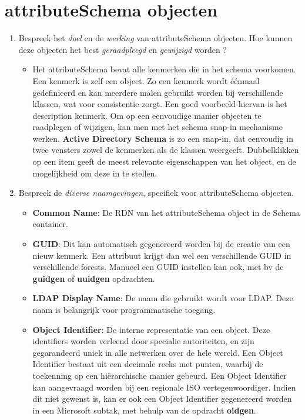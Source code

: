 \documentclass{report}
\newcommand{\vraag}[2]{
	\item #1
	
	#2
}
\begin{document}
	\section{attributeSchema objecten }
	\begin{enumerate}
		\vraag { Bespreek het \textit{doel} en de \textit{werking} van attributeSchema objecten. Hoe kunnen deze objecten het best \textit{geraadpleegd} en \textit{gewijzigd} worden ? } { 
		\begin{itemize}
			\item Het attributeSchema bevat alle kenmerken die in het schema voorkomen. Een kenmerk is zelf een object. Zo een kenmerk wordt éénmaal gedefinieerd en kan meerdere malen gebruikt worden bij verschillende klassen, wat voor consistentie zorgt. Een goed voorbeeld hiervan is het description kenmerk. Om op een eenvoudige manier objecten te raadplegen of wijzigen, kan men met het schema snap-in mechanisme werken. \textbf{Active Directory Schema} is zo een snap-in, dat eenvoudig in twee vensters zowel de kenmerken als de klassen weergeeft. Dubbelklikken op een item geeft de meest relevante eigenschappen van het object, en de mogelijkheid om deze in te stellen. 
		\end{itemize}
		}
		
		\vraag { Bespreek de \textit{diverse naamgevingen}, specifiek voor attributeSchema objecten. } { 
			\begin{itemize}
				\item \textbf{Common Name}: De RDN van het attributeSchema object in de Schema container.
				\item \textbf{GUID}: Dit kan automatisch gegenereerd worden bij de creatie van een nieuw kenmerk. Een attribuut krijgt dan wel een verschillende GUID in verschillende forests. Manueel een GUID instellen kan ook, met bv de \textbf{guidgen} of \textbf{uuidgen} opdrachten.
				\item \textbf{LDAP Display Name}: De naam die gebruikt wordt voor LDAP. Deze naam is belangrijk voor programmatische toegang.
				\item \textbf{Object Identifier}: De interne representatie van een object. Deze identifiers worden verleend door specialie autoriteiten, en zijn gegarandeerd uniek in alle netwerken over de hele wereld. Een Object Identifier bestaat uit een decimale reeks met punten, waarbij de toekenning op een hiërarchische manier gebeurd. Een Object Identifier kan aangevraagd worden bij een regionale ISO vertegenwoordiger. Indien dit niet gewenst is, kan er ook een Object Identifier gegenereerd worden in een Microsoft subtak, met behulp van de opdracht \textbf{oidgen}.
			\end{itemize}
		}
		

\end{enumerate}
\end{document}
